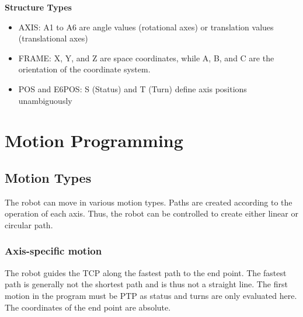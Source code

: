 \large {\textbf {Structure Types}}
\begin{itemize}
	\item AXIS: A1 to A6 are angle values (rotational axes) or translation values (translational axes)\\
	\item FRAME: X, Y, and Z are space coordinates, while A, B, and C are the orientation of the coordinate system.\\

\item POS and E6POS:  S (Status) and T (Turn) define axis positions unambiguously\\
\end{itemize}

	\section{Motion Programming}
\subsection{Motion Types}
The robot can move in various motion types. Paths are created according to the operation of each axis. Thus, the robot can be controlled to create either linear or circular path.
\subsubsection{Axis-specific motion}
	   The robot guides the TCP along the fastest path to the end point. The fastest path is generally not the shortest path and is thus not a straight line. The first motion in the program must be PTP as status and turns are only evaluated here.
	   The coordinates of the end point are absolute.
